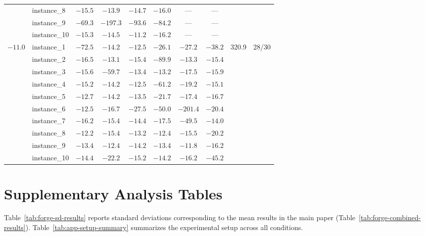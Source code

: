 \documentclass[sigconf]{acmart}
\begin{document}
\begin{table}[htbp]
\begin{tabular}{llcccccccc}
       & instance\_8 & $-15.5$ & $-13.9$ & $-14.7$ & $-16.0$ & — & — & & \\
       & instance\_9 & $-69.3$ & $-197.3$ & $-93.6$ & $-84.2$ & — & — & & \\
       & instance\_10 & $-15.3$ & $-14.5$ & $-11.2$ & $-16.2$ & — & — & & \\
\addlinespace
$-11.0$ & instance\_1 & $-72.5$ & $-14.2$ & $-12.5$ & $-26.1$ & $-27.2$ & $-38.2$ & \multirow{10}{*}{320.9} & \multirow{10}{*}{28/30} \\
        & instance\_2 & $-16.5$ & $-13.1$ & $-15.4$ & $-89.9$ & $-13.3$ & $-15.4$ & & \\
        & instance\_3 & $-15.6$ & $-59.7$ & $-13.4$ & $-13.2$ & $-17.5$ & $-15.9$ & & \\
        & instance\_4 & $-15.2$ & $-14.2$ & $-12.5$ & $-61.2$ & $-19.2$ & $-15.1$ & & \\
        & instance\_5 & $-12.7$ & $-14.2$ & $-13.5$ & $-21.7$ & $-17.4$ & $-16.7$ & & \\
        & instance\_6 & $-12.5$ & $-16.7$ & $-27.5$ & $-50.0$ & $-201.4$ & $-20.4$ & & \\
        & instance\_7 & $-16.2$ & $-15.4$ & $-14.4$ & $-17.5$ & $-49.5$ & $-14.0$ & & \\
        & instance\_8 & $-12.2$ & $-15.4$ & $-13.2$ & $-12.4$ & $-15.5$ & $-20.2$ & & \\
        & instance\_9 & $-13.4$ & $-12.4$ & $-14.2$ & $-13.4$ & $-11.8$ & $-16.2$ & & \\
        & instance\_10 & $-14.4$ & $-22.2$ & $-15.2$ & $-14.2$ & $-16.2$ & $-45.2$ & & \\
\bottomrule
\end{tabular}
\end{table}

\section{Supplementary Analysis Tables}
\label{app:supplementary-tables}

Table~\ref{tab:forge-sd-results} reports standard deviations corresponding to the mean results in the main paper (Table~\ref{tab:forge-combined-results}). Table~\ref{tab:app-setup-summary} summarizes the experimental setup across all conditions.
\end{document}
